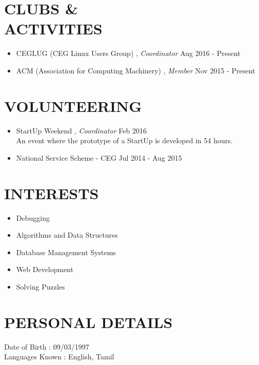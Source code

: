 \documentclass[margin, 10pt]{res} %
\begin{document}
\begin{resume}

\section{CLUBS \& \\ ACTIVITIES}
\begin{itemize}
\item CEGLUG (CEG Linux Users Group) , {\sl Coordinator} \hfill Aug 2016 - Present
\item ACM (Association for Computing Machinery) , {\sl Member} \hfill Nov 2015 - Present
\end{itemize}

\section{VOLUNTEERING}
\begin{itemize}
\item StartUp Weekend , {\sl Coordinator} \hfill Feb 2016 \\
An event where the prototype of a StartUp is developed in 54 hours.
\item National Service Scheme - CEG \hfill Jul 2014 - Aug 2015 
\end{itemize}

\section{INTERESTS} 
\begin{itemize}
\item Debugging
\item Algorithms and Data Structures
\item Database Management Systems
\item Web Development
\item Solving Puzzles
\end{itemize}
 
\section{PERSONAL DETAILS}
Date of Birth \hspace{18pt} : 09/03/1997 \\
Languages Known \hspace{1pt}: English, Tamil
\end{resume}
\end{document}
